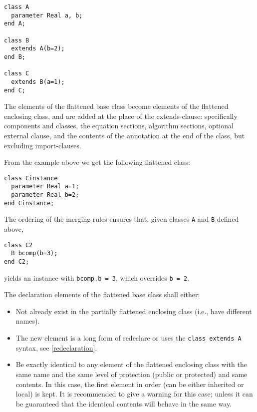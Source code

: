 \begin{example}
\begin{lstlisting}[language=modelica]
class A
  parameter Real a, b;
end A;

class B
  extends A(b=2);
end B;

class C
  extends B(a=1);
end C;
\end{lstlisting}
\end{example}

The elements of the flattened base class become elements of the
flattened enclosing class, and are added at the place of the
extends-clause: specifically components and classes, the equation
sections, algorithm sections, optional external clause, and the contents
of the annotation at the end of the class, but excluding import-clauses.

\begin{nonnormative}
From the example above we get the following flattened class:
\begin{lstlisting}[language=modelica]
class Cinstance
  parameter Real a=1;
  parameter Real b=2;
end Cinstance;
\end{lstlisting}

The ordering of the merging rules ensures that, given classes \lstinline!A!
and \lstinline!B! defined above,
\begin{lstlisting}[language=modelica]
class C2
  B bcomp(b=3);
end C2;
\end{lstlisting}
yields an instance with \lstinline!bcomp.b = 3!, which overrides \lstinline!b = 2!.
\end{nonnormative}

The declaration elements of the flattened base class shall either:
\begin{itemize}
\item
  Not already exist in the partially flattened enclosing class
  (i.e., have different names).
\item
  The new element is a long form of redeclare or uses the \lstinline!class extends A! syntax, see \cref{redeclaration}.
\item
  Be exactly identical to any element of the flattened enclosing class
  with the same name and the same level of protection (public or
  protected) and same contents. In this case, the first element in order
  (can be either inherited or local) is kept. It is recommended to give
  a warning for this case; unless it can be guaranteed that the
  identical contents will behave in the same way.
\end{itemize}

